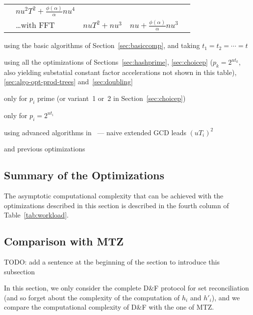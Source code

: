 \documentclass{llncs}
\newcommand{\df}{D\&F\xspace}
\begin{document}
\begin{table}[ht]
\begin{threeparttable}
\begin{tabularx}{\textwidth}{lXC{3cm}C{3cm}l}
      & $n u^2 T^2 + \frac{\phi(\alpha)}{\alpha} n u^4$ \\
      & \dots with FFT
      & $n u T^2 + n u^3$
      & $n u + \frac{\phi(\alpha)}{\alpha} n u^3$ \\
\bottomrule
  \end{tabularx}
  \begin{tablenotes}
    \item[a] using the basic algorithms of Section~\ref{sec:basiccomp}, and taking $t_1=t_2=\cdots=t$
    \item[b] using all the optimizations of Sections~\ref{sec:hashprime}, \ref{sec:choicep} ($p_k = 2^{ut_k}$, also yielding substatial constant factor accelerations not shown in this table), \ref{sec:algo-opt-prod-trees} and~\ref{sec:doubling}
    \item[c] only for $p_i$ prime (or variant~1 or~2 in Section~\ref{sec:choicep})
    \item[d] only for $p_i = 2^{ut_i}$
    \item[e] using advanced algorithms in~\cite{pan2004rational,wang2003acceleration} --- naive extended GCD leads $(uT_i)^2$
    \item[f] and previous optimizations\smallskip
  \end{tablenotes}
 \end{threeparttable}
\end{table}

\subsection{Summary of the Optimizations}

The asymptotic computational complexity that can be achieved with the optimizations described in this section is described in the fourth column of Table~\ref{tab:workload}.

\subsection{Comparison with MTZ}\label{sec:opt-MTZ}

TODO: add a sentence at the beginning of the section to introduce this subsection


In this section, we only consider the complete \df protocol for set reconciliation (and so forget about the complexity of the computation of $h_i$ and $h'_i$), and we compare the computational complexity of \df with the one of MTZ.
\end{document}
